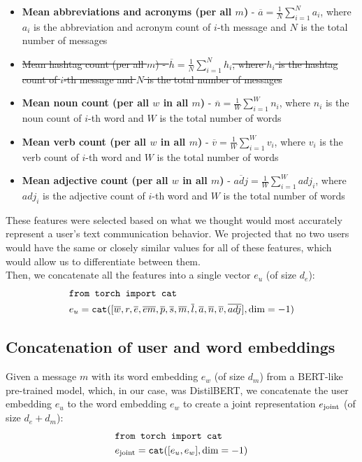\documentclass{article}
\begin{document}
\begin{itemize}
	\item \textbf{Mean abbreviations and acronyms (per all $m$)} - \(\overline{a} = \frac{1}{N} \sum_{i=1}^{N} a_i \), where $a_i$ is the abbreviation and acronym count of $i$-th message and $N$ is the total number of messages
	\item \sout{Mean hashtag count (per all $m$) - \(\overline{h} = \frac{1}{N} \sum_{i=1}^{N} h_i \), where $h_i$ is the hashtag count of $i$-th message and $N$ is the total number of messages}
	\item \textbf{Mean noun count (per all $w$ in all $m$)} - \(\overline{n} = \frac{1}{W} \sum_{i=1}^{W} n_i \), where $n_i$ is the noun count of $i$-th word and $W$ is the total number of words
	\item \textbf{Mean verb count (per all $w$ in all $m$)} - \(\overline{v} = \frac{1}{W} \sum_{i=1}^{W} v_i \), where $v_i$ is the verb count of $i$-th word and $W$ is the total number of words
	\item \textbf{Mean adjective count (per all $w$ in all $m$)} - \(\overline{adj} = \frac{1}{W} \sum_{i=1}^{W} adj_i \), where $adj_i$ is the adjective count of $i$-th word and $W$ is the total number of words
\end{itemize}
These features were selected based on what we thought would most accurately represent a user's text communication behavior. We projected that no two users would have the same or closely similar values for all of these features, which would allow us to differentiate between them.\\
Then, we concatenate all the features into a single vector $e_u$ (of size $d_e$):
\begin{equation}
	\begin{aligned}
	&\text{\texttt{from torch import cat}} \\
	&e_u = \textnormal{\texttt{cat}}([\overline{w}, r, \overline{e}, \overline{em}, \overline{p}, \overline{s}, \overline{m}, \overline{l}, \overline{a}, \overline{n}, \overline{v}, \overline{adj}], \textnormal{dim}=-1)
	\end{aligned}
\end{equation}
\subsection{Concatenation of user and word embeddings}
Given a message $m$ with its word embedding $e_w$ (of size $d_m$) from a BERT-like pre-trained model, which, in our case, was DistilBERT\cite{sanh2020distilbert}, we concatenate the user embedding $e_u$ to the word embedding $e_w$ to create a joint representation $e_\textnormal{joint}$ (of size $d_e + d_m$):
\begin{equation}
\begin{aligned}
&\text{\texttt{from torch import cat}} \\
&e_\textnormal{joint} = \textnormal{\texttt{cat}}([e_u, e_w], \textnormal{dim}=-1)
\end{aligned}
\end{equation}
\end{document}
